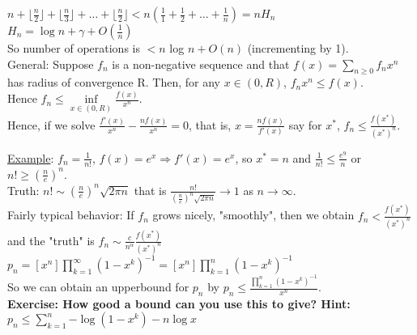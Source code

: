 \documentclass{article}
\begin{document}
\begin{flushleft}
$n+\lfloor \frac{n}{2}\rfloor+\lfloor \frac{n}{3} \rfloor + \ldots+\lfloor \frac{n}{2} \rfloor < n \left( \frac{1}{1} + \frac{1}{2} + \ldots + \frac{1}{n} \right) = n H_n$\\
\vspace{2mm}
$H_n =\log{n} + \gamma + O\left( \frac{1}{n} \right)$\\
\vspace{2mm}
So number of operations is $< n$ log $n + O(n)$ (incrementing by 1).\\
General: Suppose $f_n$ is a non-negative sequence and that $f(x) = \sum\limits_{n \geq 0}{f_n x^n}$ has radius of convergence R. Then, for any $x \in (0,R)$, $f_n x^n \leq f(x)$.\\
\vspace{2mm}
Hence $f_n \leq \inf\limits_{x \in (0,R)} \frac{f(x)}{x^n}$.\\
\vspace{2mm}
Hence, if we solve $ \frac{f'(x)}{x^n} -  \frac{nf(x)}{x^n} = 0$, that is, $ x =  \frac{nf(x)}{f'(x)}$ say for $x^*$, $f_n \leq  \frac{f(x^*)}{(x^*)^n}$.\\
\newpage

\underline{Example}: $f_n = \frac{1}{n!}$, $f(x)=e^x \Rightarrow f'(x)=e^x$, so $x^* = n$ and $\frac{1}{n!} \leq \frac{e^9}{n}$ or $n! \geq \left(\frac{n}{e}\right)^n$.   \\
\vspace{2mm}
Truth: $n!\sim \left(\frac{n}{e}\right)^n\sqrt{2 \pi n}$ that is $\frac{n!}{\left(\frac{n}{e}\right)^n \sqrt{2 \pi n}} \rightarrow 1$ as $n \rightarrow \infty$.\\
\vspace{2mm}
Fairly typical behavior: If $f_n$ grows nicely, "smoothly", then we obtain $f_n < \frac{f(x^*)}{(x^*)^n}$ and the "truth" is $f_n \sim \frac{c}{n^{\alpha}} \frac{f(x^*)}{(x^*)^n}$\\
\vspace{2mm}
$p_n = [x^n] \prod\limits_{k=1}^{\infty}{(1-x^k)^{-1}} =  [x^n] \prod\limits_{k=1}^{n}{(1-x^k)^{-1}}$ \\
\vspace{2mm}
So we can obtain an upperbound for $p_n$ by $p_n \leq \frac{\prod\limits_{k=1}^{n}{(1-x^k)^{-1}}}{x^n}$.\\

\vspace{3mm}
\textbf{
{\color{red}Exercise: How good a bound can you use this to give? Hint: $p_n \leq \sum\limits_{k=1}^{n}{-\log{(1-x^k)}-n\log{x}}$}}\\
\end{flushleft}
\end{document}
